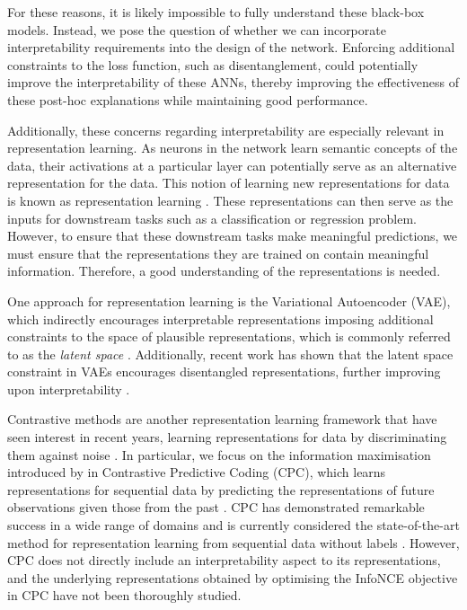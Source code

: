 For these reasons, it is likely impossible to fully understand these black-box models. Instead, we pose the question of whether we can incorporate interpretability requirements into the design of the network. Enforcing additional constraints to the loss function, such as disentanglement, could potentially improve the interpretability of these ANNs, thereby improving the effectiveness of these post-hoc explanations while maintaining good performance.


Additionally, these concerns regarding interpretability are especially relevant in representation learning. As neurons in the network learn semantic concepts of the data, their activations at a particular layer can potentially serve as an alternative representation for the data. This notion of learning new representations for data is known as representation learning \citep{le-khacContrastiveRepresentationLearning2020}. These representations can then serve as the inputs for downstream tasks such as a classification or regression problem. However, to ensure that these downstream tasks make meaningful predictions, we must ensure that the representations they are trained on contain meaningful information. Therefore, a good understanding of the representations is needed.


One approach for representation learning is the Variational Autoencoder (VAE), which indirectly encourages interpretable representations imposing additional constraints to the space of plausible representations, which is commonly referred to as the \textit{latent space} \citep{kingmaAutoEncodingVariationalBayes2022}. Additionally, recent work has shown that the latent space constraint in VAEs encourages disentangled representations, further improving upon interpretability \citep{burgessUnderstandingDisentanglingBeta2018, sikkaCloserLookDisentangling2019, higginsBetaVAELearningBasic2022}.

Contrastive methods are another representation learning framework that have seen interest in recent years, learning representations for data by discriminating them against noise \citep{chenSimpleFrameworkContrastive2020}. In particular, we focus on the information maximisation introduced by \cite{oordRepresentationLearningContrastive2019} in Contrastive Predictive Coding (CPC), which learns representations for sequential data by predicting the representations of future observations given those from the past \cite{henaffDataEfficientImageRecognition2020}. CPC has demonstrated remarkable success in a wide range of domains and is currently considered the state-of-the-art method for representation learning from sequential data without labels \citep{stackeEvaluationContrastivePredictive2020, dehaanContrastivePredictiveCoding2021, luSemiSupervisedHistologyClassification2019, bhatiSegmentalContrastivePredictive2021, deldariTimeSeriesChange2021, henaffDataEfficientImageRecognition2020}. However, CPC does not directly include an interpretability aspect to its representations, and the underlying representations obtained by optimising the InfoNCE objective in CPC have not been thoroughly studied.



